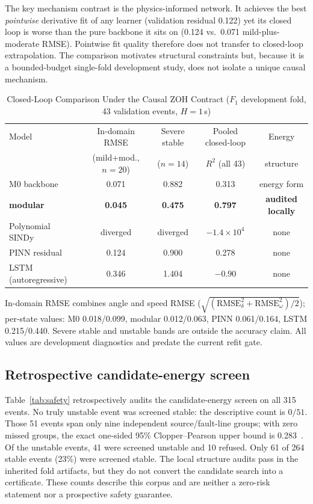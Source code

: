 \documentclass[journal]{IEEEtran}
\begin{document}
The key mechanism contrast is the physics-informed network. It achieves the best
\emph{pointwise} derivative fit of any learner (validation residual 0.122) yet
its closed loop is worse than the pure backbone it sits on (0.124 vs.\ 0.071
mild-plus-moderate RMSE). Pointwise fit quality therefore does not transfer to
closed-loop extrapolation. The comparison motivates structural constraints but,
because it is a bounded-budget single-fold development study, does not isolate a
unique causal mechanism.

\begin{table}[!t]
\caption{Closed-Loop Comparison Under the Causal ZOH Contract ($F_1$ development
fold, 43 validation events, $H{=}1$\,s)}
\label{tab:baselines}
\centering
\footnotesize
\setlength{\tabcolsep}{4pt}
\begin{tabular}{lcccc}
\toprule
Model & In-domain RMSE & Severe stable & Pooled closed-loop & Energy \\
      & (mild+mod., $n{=}20$) & ($n{=}14$) & $R^2$ (all 43) & structure \\
\midrule
M0 backbone            & 0.071 & 0.882 & 0.313 & energy form \\
\textbf{modular}       & \textbf{0.045} & \textbf{0.475} & \textbf{0.797} & \textbf{audited locally} \\
Polynomial SINDy       & diverged & diverged & $-1.4\times10^{4}$ & none \\
PINN residual          & 0.124 & 0.900 & 0.278 & none \\
LSTM (autoregressive)  & 0.346 & 1.404 & $-0.90$ & none \\
\bottomrule
\end{tabular}
\par\smallskip
\parbox{\textwidth}{\footnotesize In-domain RMSE combines angle and speed RMSE
($\sqrt{(\mathrm{RMSE}_\delta^2+\mathrm{RMSE}_\omega^2)/2}$); per-state values:
M0 0.018/0.099, modular 0.012/0.063, PINN 0.061/0.164, LSTM 0.215/0.440.
Severe stable and unstable bands are outside the accuracy claim. All values are
development diagnostics and predate the current refit gate.}
\end{table}

\subsection{Retrospective candidate-energy screen}
\label{sec:safety}
Table~\ref{tab:safety} retrospectively audits the candidate-energy screen on all
315 events. No truly unstable event was screened stable: the descriptive count
is $0/51$. Those 51 events span only nine independent source/fault-line groups;
with zero missed groups, the exact one-sided 95\% Clopper--Pearson upper bound is
0.283~\cite{clopper1934}. Of the unstable events, 41 were screened unstable and
10 refused. Only 61 of 264 stable events (23\%) were screened stable. The local
structure audits pass in the inherited fold artifacts, but they do not convert
the candidate search into a certificate. These counts describe this corpus and
are neither a zero-risk statement nor a prospective safety guarantee.
\end{document}
